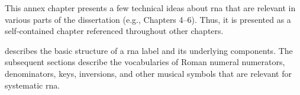 
This annex chapter presents a few technical ideas about
\gls{rna} that are relevant in various parts of the
dissertation (e.g., Chapters 4--6). Thus, it is presented as
a self-contained chapter referenced throughout other
chapters.

 describes
the basic structure of a \gls{rna} label and its underlying
components. The subsequent sections describe the
vocabularies of Roman numeral numerators, denominators,
keys, inversions, and other musical symbols that are
relevant for systematic \gls{rna}.
